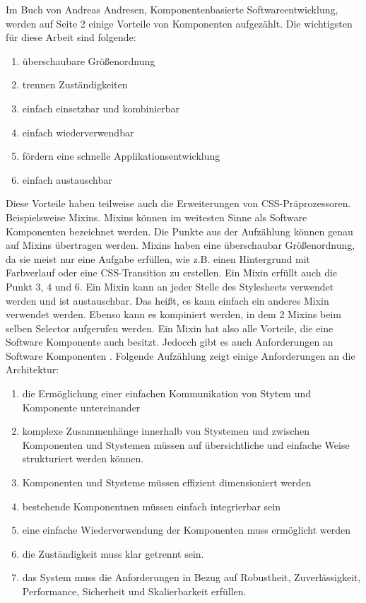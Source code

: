 Im Buch von Andreas Andresen, Komponentenbasierte Softwareentwicklung, \autocite[]{Andresen.2003} werden auf Seite 2 einige Vorteile von Komponenten aufgezählt. Die wichtigsten für diese Arbeit sind folgende:
\begin{enumerate}
  \item überschaubare Größenordnung
  \item trennen Zuständigkeiten
  \item einfach einsetzbar und kombinierbar
  \item einfach wiederverwendbar
  \item fördern eine schnelle Applikationsentwicklung
  \item einfach austauschbar
\end{enumerate} 
Diese Vorteile haben teilweise auch die Erweiterungen von CSS-Präprozessoren. Beispielsweise Mixins. Mixins können im weitesten Sinne als Software Komponenten bezeichnet werden. Die Punkte aus der Aufzählung können genau auf Mixins übertragen werden. Mixins haben eine überschaubar Größenordnung, da sie meist nur eine Aufgabe erfüllen, wie z.B. einen Hintergrund mit Farbverlauf oder eine CSS-Transition zu erstellen.\newline
Ein Mixin erfüllt auch die Punkt 3, 4 und 6. Ein Mixin kann an jeder Stelle des Stylesheets verwendet werden und ist austauschbar. Das heißt, es kann einfach ein anderes Mixin verwendet werden. Ebenso kann es kompiniert werden, in dem 2 Mixins beim selben Selector aufgerufen werden.\newline
Ein Mixin hat also alle Vorteile, die eine Software Komponente auch besitzt. Jedocch gibt es auch Anforderungen an Software Komponenten \autocite[6]{Andresen.2003}. Folgende Aufzählung zeigt einige Anforderungen an die Architektur:
\begin{enumerate}
\item die Ermöglichung einer einfachen Kommunikation von Stytem und Komponente untereinander
\item komplexe Zusammenhänge innerhalb von Stystemen und zwischen Komponenten und Stystemen müssen auf übersichtliche und einfache Weise strukturiert werden können.
\item Komponenten und Stysteme müssen effizient dimensioniert werden
\item bestehende Komponentnen müssen einfach integrierbar sein
\item eine einfache Wiederverwendung der Komponenten muss ermöglicht werden
\item die Zuständigkeit muss klar getrennt sein.
\item das System muss die Anforderungen in Bezug auf Robustheit, Zuverlässigkeit, Performance, Sicherheit und Skalierbarkeit erfüllen.
\end{enumerate}
